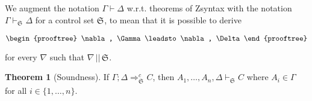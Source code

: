 \documentclass{article}
\theoremstyle{definition}
\newtheorem{theorem}{Theorem}
\newcommand{\ctrlset}[1]{\mathfrak{S}_{#1}}
\newcommand{\respects}[2]{#1 \, || \, #2}
\begin{document}
\begin{definition}
  We augment the notation $\Gamma \vdash \Delta$ w.r.t. theorems of Zsyntax with
  the notation $\Gamma \vdash_{\ctrlset{}} \Delta$ for a control set
  $\ctrlset{}$, to mean that it is possible to derive

  \[
    \begin{prooftree}
      \nabla, \Gamma
      \leadsto
      \nabla, \Delta
    \end{prooftree}
  \]

  for every $\nabla$ such that $\respects{\nabla}{\ctrlset{}}$.
\end{definition}

\begin{theorem}[Soundness]
  If $\Gamma; \Delta \Longrightarrow^c_{\ctrlset{}} C$, then
  $A_1, \dots, A_n, \Delta \vdash_{\ctrlset{}} C$ where $A_i \in \Gamma$ for
  all $i \in \{ 1, \dots, n\}$.
\end{theorem}
\end{document}
